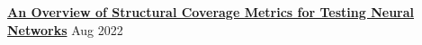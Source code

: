 \textbf{\href{https://arxiv.org/abs/2208.03407}{An Overview of Structural Coverage Metrics for Testing Neural Networks}} \hfill Aug 2022 \par